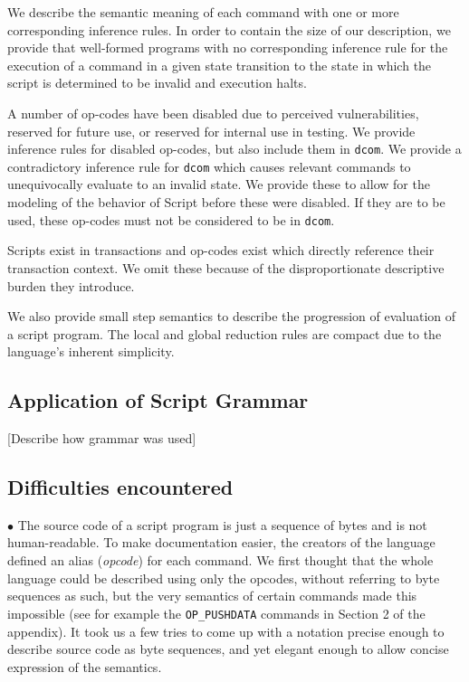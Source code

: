 \documentclass[letterpaper, 10 pt, conference]{ieeeconf}
\begin{document}
We describe the semantic meaning of each command with one or more corresponding inference rules. In order to contain the size of our description, we provide that well-formed programs with no corresponding inference rule for the execution of a command in a given state transition to the state in which the script is determined to be invalid and execution halts.

A number of op-codes have been disabled due to perceived vulnerabilities, reserved for future use, or reserved for internal use in testing. We provide inference rules for disabled op-codes, but also include them in \texttt{dcom}. We provide a contradictory inference rule for \texttt{dcom} which causes relevant commands to unequivocally evaluate to an invalid state. We provide these to allow for the modeling of the behavior of Script before these were disabled. If they are to be used, these op-codes must not be considered to be in \texttt{dcom}.

Scripts exist in transactions and op-codes exist which directly reference their transaction context. We omit these because of the disproportionate descriptive burden they introduce.

We also provide small step semantics to describe the progression of evaluation of a script program. The local and global reduction rules are compact due to the language's inherent simplicity.

\subsection{Application of Script Grammar}

[Describe how grammar was used]

\subsection{Difficulties encountered}

$\bullet$ The source code of a script program is just a sequence of bytes and is not human-readable. To make documentation easier, the creators of the language defined an alias (\textit{opcode}) for each command. We first thought that the whole language could be described using only the opcodes, without referring to byte sequences as such, but the very semantics of certain commands made this impossible (see for example the \texttt{OP\_PUSHDATA} commands in Section 2 of the appendix). It took us a few tries to come up with a notation precise enough to describe source code as byte sequences, and yet elegant enough to allow concise expression of the semantics.
\end{document}
